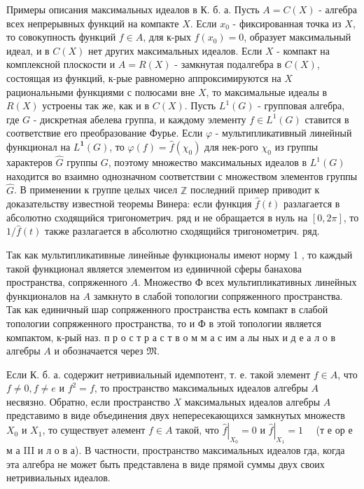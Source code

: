 \documentclass[10pt]{article}
\begin{document}
Примеры описания максимальных идеалов в К. б. а. Пусть $A=C(X)$ - алгебра всех непрерывных функций на компакте $X$. Если $x_{0}$ - фиксированная точка из $X$, то совокупность функций $f \in A$, для к-рых $f\left(x_{0}\right)=0$, образует максимальный идеал, и в $C(X)$ нет других максимальных идеалов. Если $X$ - компакт на комплексной плоскости и $A=R(X)$ - замкнутая подалгебра в $C(X)$, состоящая из функций, к-рые равномерно аппроксимируются на $X$ рациональными функциями с полюсами вне $X$, то максимальные идеалы в $R(X)$ устроены так же, как и в $C(X)$. Пусть $L^{1}(G)$ - групповая алгебра, где $G$ - дискретная абелева группа, и каждому элементу $f \in L^{1}(G)$ ставится в соответствие его преобразование Фурье. Если $\varphi$ - мультипликативный линейный функционал на $L^{\mathbf{1}}(G)$, то $\varphi(f)=\hat{f}\left(\chi_{0}\right)$ для нек-рого $\chi_{0}$ из группы характеров $\widehat{G}$ группы $G$, поэтому множество максимальных идеалов в $L^{1}(G)$ находится во взаимно однозначном соответствии с множеством элементов группы $\hat{G}$. В применении к группе целых чисел $\mathbb{Z}$ последний пример приводит к доказательству известной теоремы Винера: если функция $\hat{f}(t)$ разлагается в абсолютно сходящийся тригонометрич. ряд и не обращается в нуль на $[0,2 \pi]$, то $1 / \hat{f}(t)$ также разлагается в абсолютно сходящийся тригонометрич. ряд.



Так как мультипликативные линейные функционалы имеют норму 1 , то каждый такой функционал является элементом из единичной сферы банахова пространства, сопряженного $A$. Множество Ф всех мультипликативных линейных функционалов на $A$ замкнуто в слабой топологии сопряженного пространства. Так как единичный шар сопряженного пространства есть компакт в слабой топологии сопряженного пространства, то и Ф в этой топологии является компактом, к-рый наз. п р о с т р а с т в о м м а с им а лы ных и д е а л о в алгебры $A$ и обозначается через $\mathfrak{M}$.



Если К. б. а. содержит нетривиальный идемпотент, т. е. такой элемент $f \in A$, что $f \neq 0, f \neq e$ и $f^{2}=f$, то пространство максимальных идеалов алгебры $A$ несвязно. Обратно, если пространство $X$ максимальных идеалов алгебры $A$ представимо в виде объединения двух непересекающихся замкнутых множеств $X_{0}$ и $X_{1}$, то существует әлемент $f \in A$ такой, что $\left.\hat{f}\right|_{X_{0}}=0$ и $\left.\hat{f}\right|_{X_{1}}=1 \quad$ (т е ор е м а III и л о в а). В частности, пространство максимальных идеалов гда, когда эта алгебра не может быть представлена в виде прямой суммы двух своих нетривиальных идеалов.
\end{document}
